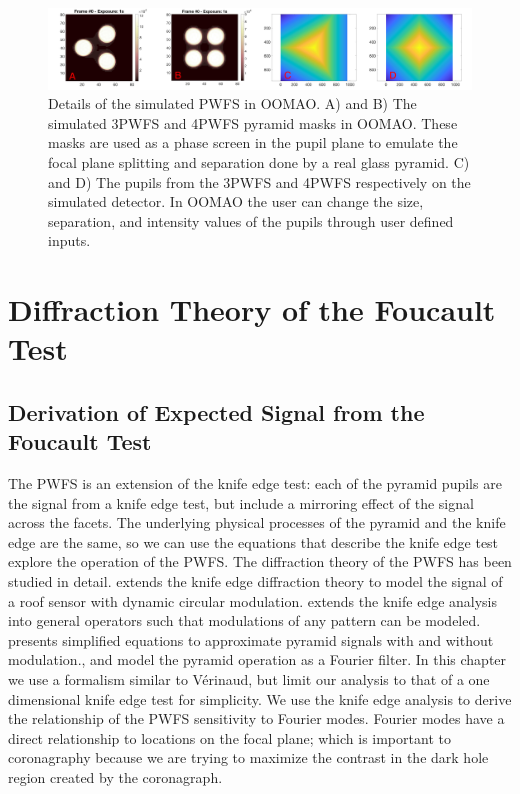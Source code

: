 \begin{figure}
    \centering
    \includegraphics[width=1\textwidth]{Chapter Materials/Chapter Two Materials/oomaoFigs.png}
    \caption{Details of the simulated PWFS in OOMAO. A) and B) The simulated 3PWFS and 4PWFS pyramid masks in OOMAO. These masks are used as a phase screen in the pupil plane to emulate the focal plane splitting and separation done by a real glass pyramid. C) and D) The pupils from the 3PWFS and 4PWFS respectively on the simulated detector. In OOMAO the user can change the size, separation, and intensity values of the pupils through user defined inputs.}
    \label{fig:oomaoFigs}
\end{figure}


\section{Diffraction Theory of the Foucault Test}\label{diffraction}
\subsection{Derivation of Expected Signal from the Foucault Test}
  The PWFS is an extension of the knife edge test: each of the pyramid pupils are the signal from a knife edge test, but include a mirroring effect of the signal across the facets. The underlying physical processes of the pyramid and the knife edge are the same, so we can use the equations that describe the knife edge test explore the operation of the PWFS. The diffraction theory of the PWFS has been studied in detail. \cite{verinaud2004nature} extends the knife edge diffraction theory to model the signal of a roof sensor with dynamic circular modulation. \cite{hutterer2019real} extends the knife edge analysis into general operators such that modulations of any pattern can be modeled. \cite{shatokhina2014fast} presents simplified equations to approximate pyramid signals with and without modulation.\cite{correia2020performance}, and \cite{fauvarque2019kernel} model the pyramid operation as a Fourier filter. In this chapter we use a formalism similar to Vérinaud, but limit our analysis to that of a one dimensional knife edge test for simplicity. We use the knife edge analysis to derive the relationship of the PWFS sensitivity to Fourier modes. Fourier modes have a direct relationship to locations on the focal plane; which is important to coronagraphy because we are trying to maximize the contrast in the dark hole region created by the coronagraph.
 

